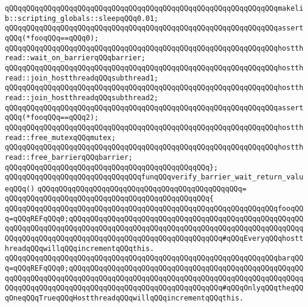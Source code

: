 \newline
\verb|qQQqqQQqqQQqqQQqqQQqqQQqqQQqqQQqqQQqqQQqqQQqqQQqqQQqqQQqqQQqqQQqmakelib::scripting_globals::sleepqQQq0.01;|\newline
\newline
\verb|qQQqqQQqqQQqqQQqqQQqqQQqqQQqqQQqqQQqqQQqqQQqqQQqqQQqqQQqqQQqqQQqassertqQQq(*fooqQQq==qQQq0);|\newline
\newline
\verb|qQQqqQQqqQQqqQQqqQQqqQQqqQQqqQQqqQQqqQQqqQQqqQQqqQQqqQQqqQQqqQQqhostthread::wait_on_barrierqQQqbarrier;|\newline
\newline
\verb|qQQqqQQqqQQqqQQqqQQqqQQqqQQqqQQqqQQqqQQqqQQqqQQqqQQqqQQqqQQqqQQqhostthread::join_hostthreadqQQqsubthread1;|\newline
\newline
\verb|qQQqqQQqqQQqqQQqqQQqqQQqqQQqqQQqqQQqqQQqqQQqqQQqqQQqqQQqqQQqqQQqhostthread::join_hostthreadqQQqsubthread2;|\newline
\newline
\verb|qQQqqQQqqQQqqQQqqQQqqQQqqQQqqQQqqQQqqQQqqQQqqQQqqQQqqQQqqQQqqQQqassertqQQq(*fooqQQq==qQQq2);|\newline
\newline
\verb|qQQqqQQqqQQqqQQqqQQqqQQqqQQqqQQqqQQqqQQqqQQqqQQqqQQqqQQqqQQqqQQqhostthread::free_mutexqQQqmutex;|\newline
\verb|qQQqqQQqqQQqqQQqqQQqqQQqqQQqqQQqqQQqqQQqqQQqqQQqqQQqqQQqqQQqqQQqhostthread::free_barrierqQQqbarrier;|\newline
\verb|qQQqqQQqqQQqqQQqqQQqqQQqqQQqqQQqqQQqqQQqqQQqqQQq};|\newline
\newline
\verb|qQQqqQQqqQQqqQQqqQQqqQQqqQQqqQQqfunqQQqverify_barrier_wait_return_valueqQQq()|\newline
\verb|qQQqqQQqqQQqqQQqqQQqqQQqqQQqqQQqqQQqqQQqqQQqqQQq=|\newline
\verb|qQQqqQQqqQQqqQQqqQQqqQQqqQQqqQQqqQQqqQQqqQQqqQQq{|\newline
\verb|qQQqqQQqqQQqqQQqqQQqqQQqqQQqqQQqqQQqqQQqqQQqqQQqqQQqqQQqqQQqqQQqfooqQQq=qQQqREFqQQq0;qQQqqQQqqQQqqQQqqQQqqQQqqQQqqQQqqQQqqQQqqQQqqQQqqQQqqQQqqQQqqQQqqQQqqQQqqQQqqQQqqQQqqQQqqQQqqQQqqQQqqQQqqQQqqQQqqQQqqQQqqQQqqQQqqQQqqQQqqQQqqQQqqQQqqQQqqQQqqQQqqQQqqQQqqQQqqQQq#qQQqEveryqQQqhostthreadqQQqwillqQQqincrementqQQqthis.|\newline
\verb|qQQqqQQqqQQqqQQqqQQqqQQqqQQqqQQqqQQqqQQqqQQqqQQqqQQqqQQqqQQqqQQqbarqQQq=qQQqREFqQQq0;qQQqqQQqqQQqqQQqqQQqqQQqqQQqqQQqqQQqqQQqqQQqqQQqqQQqqQQqqQQqqQQqqQQqqQQqqQQqqQQqqQQqqQQqqQQqqQQqqQQqqQQqqQQqqQQqqQQqqQQqqQQqqQQqqQQqqQQqqQQqqQQqqQQqqQQqqQQqqQQqqQQqqQQqqQQqqQQq#qQQqOnlyqQQqtheqQQqOneqQQqTrueqQQqHostthreadqQQqwillqQQqincrementqQQqthis.|\newline
